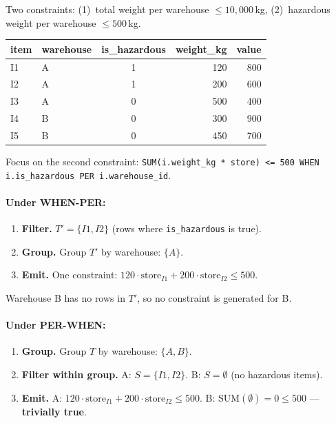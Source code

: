 \documentclass[11pt]{article}
\begin{document}
Two constraints: (1)~total weight per warehouse $\leq 10{,}000$\,kg,
(2)~hazardous weight per warehouse $\leq 500$\,kg.

\begin{center}
\begin{tabular}{llcrr}
\toprule
\textbf{item} & \textbf{warehouse} & \textbf{is\_hazardous} & \textbf{weight\_kg} & \textbf{value} \\
\midrule
I1 & A & 1 & 120 & 800  \\
I2 & A & 1 & 200 & 600  \\
I3 & A & 0 & 500 & 400  \\
I4 & B & 0 & 300 & 900  \\
I5 & B & 0 & 450 & 700  \\
\bottomrule
\end{tabular}
\end{center}

Focus on the second constraint:
\texttt{SUM(i.weight\_kg * store) <= 500 WHEN i.is\_hazardous PER i.warehouse\_id}.

\paragraph{Under WHEN-PER:}
\begin{enumerate}[leftmargin=2em]
    \item \textbf{Filter.} $T' = \{I1, I2\}$ (rows where \texttt{is\_hazardous} is true).
    \item \textbf{Group.} Group $T'$ by warehouse: $\{A\}$.
    \item \textbf{Emit.} One constraint: $120 \cdot \text{store}_{I1} + 200 \cdot \text{store}_{I2} \leq 500$.
\end{enumerate}
Warehouse B has no rows in $T'$, so no constraint is generated for B.

\paragraph{Under PER-WHEN:}
\begin{enumerate}[leftmargin=2em]
    \item \textbf{Group.} Group $T$ by warehouse: $\{A, B\}$.
    \item \textbf{Filter within group.}
        A: $S = \{I1, I2\}$.
        B: $S = \emptyset$ (no hazardous items).
    \item \textbf{Emit.}
        A: $120 \cdot \text{store}_{I1} + 200 \cdot \text{store}_{I2} \leq 500$.
        B: $\text{SUM}(\emptyset) = 0 \leq 500$ --- \textbf{trivially true}.
\end{enumerate}
\end{document}
